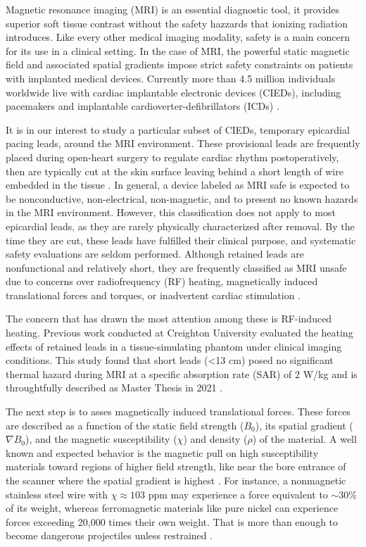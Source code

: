 Magnetic resonance imaging (MRI) is an essential diagnostic tool, it provides superior soft tissue contrast without the safety hazzards that ionizing radiation introduces. Like every other medical imaging modality, safety is a main concern for its use in a clinical setting. In the case of MRI, the powerful static magnetic field and associated spatial gradients impose strict safety constraints on patients with implanted medical devices. Currently more than 4.5 million individuals worldwide live with cardiac implantable electronic devices (CIEDs), including pacemakers and implantable cardioverter-defibrillators (ICDs)  \citep{aboyewa2021,benjamin2017}. 

It is in our interest to study a particular subset of CIEDs, temporary epicardial pacing leads, around the MRI environment. These provisional leads are frequently placed during open-heart surgery to regulate cardiac rhythm postoperatively, then are typically cut at the skin surface leaving behind a short length of wire embedded in the tissue \citep{reade2007}. In general, a device labeled as MRI safe is expected to be nonconductive, non-electrical, non-magnetic, and to present no known hazards in the MRI environment. However, this classification does not apply to most epicardial leads, as they are rarely physically characterized after removal. By the time they are cut, these leads have fulfilled their clinical purpose, and systematic safety evaluations are seldom performed. Although retained leads are nonfunctional and relatively short, they are frequently classified as MRI unsafe due to concerns over radiofrequency (RF) heating, magnetically induced translational forces and torques, or inadvertent cardiac stimulation \citep{poh2017,muthalaly2018}.

The concern that has drawn the most attention among these is RF-induced heating.  Previous work conducted at Creighton University evaluated the heating effects of retained leads in a tissue-simulating phantom under clinical imaging conditions. This study found that short leads (<13 cm) posed no significant thermal hazard during MRI at a specific absorption rate (SAR) of 2 W/kg and is throughtfully described as Master Thesis in 2021 \citep{haddixProposal,astmF2182,aboyewa2021}.

The next step is to asses magnetically induced translational forces. These forces are described as a function of the static field strength ($B_0$), its spatial gradient ($\nabla B_0$), and the magnetic susceptibility ($\chi$) and density ($\rho$) of the material. A well known and expected behavior is the magnetic pull on high susceptibility materials toward regions of higher field strength, like near the bore entrance of the scanner where the spatial gradient is highest \citep{aboyewa2021,bushberg2011,panych2018}. For instance, a nonmagnetic stainless steel wire with $\chi \approx 103$ ppm may experience a force equivalent to $\sim$30\% of its weight, whereas ferromagnetic materials like pure nickel can experience forces exceeding 20,000 times their own weight. That is more than enough to become dangerous projectiles unless restrained \citep{aboyewa2021,panych2018}.

